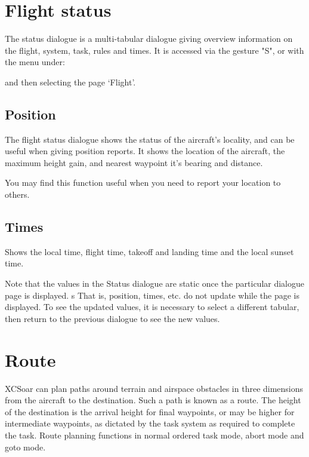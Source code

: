 \section{Flight status}\label{sec:flight-status}

The status dialogue is a multi-tabular dialogue giving overview information on the 
flight, system, task, rules and times.
It is accessed via the gesture "S", or with the menu under: 
\begin{quote}
\blink{}
\end{quote}
and then selecting the page `Flight'. 

\subsection*{Position}
The flight status dialogue shows the status of the aircraft's locality, and can 
be useful when giving position reports. It shows the location of the aircraft, the
maximum height gain, and nearest waypoint it's bearing and distance.

You may find this function useful when you need to report your
location to others.

\subsection*{Times}
Shows the local time, flight time, takeoff and landing time and
the local sunset time.

Note that the values in the Status dialogue 
are static once the particular dialogue page is displayed. 
s
That is, position, times, etc. do not update while the page is displayed. 
To see the updated values, it is necessary to select a different tabular, 
then return to the previous dialogue to see the new values.

\section{Route}\label{sec:route}

XCSoar can plan paths around terrain and airspace obstacles in three
dimensions from the aircraft to the destination.  Such a path is known
as a route.  The height of the destination is the arrival height for
final waypoints, or may be higher for intermediate waypoints, as
dictated by the task system as required to complete the task.  Route
planning functions in normal ordered task mode, abort mode and goto
mode.

